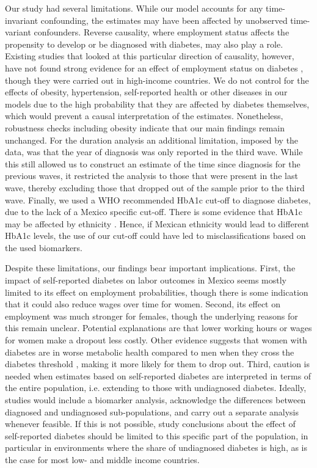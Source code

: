 \documentclass[12pt,english]{article}
\begin{document}
Our study had several limitations. While our model accounts for any time-invariant confounding, the estimates may have been affected by unobserved time-variant confounders. Reverse causality, where employment status affects the propensity to develop or be diagnosed with diabetes, may also play a role. Existing studies that looked at this particular direction of causality, however, have not found strong evidence for an effect of employment status on diabetes \parencite{Bergemann2011,Schaller2015}, though they were carried out in high-income countries. We do not control for the effects of obesity, hypertension, self-reported health or other diseases in our models due to the high probability that they are affected by diabetes themselves, which would prevent a causal interpretation of the estimates. Nonetheless, robustness checks including obesity indicate that our main findings remain unchanged.  For the duration analysis an additional limitation, imposed by the data, was that the year of diagnosis was only reported in the third wave. While this still allowed us to construct an estimate of the time since diagnosis for the previous waves, it restricted the analysis to those that were present in the last wave, thereby excluding those that dropped out of the sample prior to the third wave. Finally, we used a WHO recommended \ac{HbA1c} cut-off to diagnose diabetes, due to the lack of a Mexico specific cut-off. There is some evidence that \ac{HbA1c} may be affected by ethnicity \parencite{Sacks2011}. Hence, if Mexican ethnicity would lead to different \ac{HbA1c} levels, the use of our cut-off could have led to misclassifications based on the used biomarkers.  

Despite these limitations, our findings bear important implications. First, the impact of self-reported diabetes on labor outcomes in Mexico seems mostly limited to its effect on employment probabilities, though there is some indication that it could also reduce wages over time for women.  Second, its effect on employment was much stronger for females, though the underlying reasons for this remain unclear. Potential explanations are that lower working hours or wages for women make a dropout less costly. Other evidence suggests that women with diabetes are in worse metabolic health compared to men when they cross the diabetes threshold \parencite{Peters2015}, making it more likely for them to drop out. Third, caution is needed when estimates based on self-reported diabetes are interpreted in terms of the entire population, i.e. extending to those with undiagnosed diabetes. Ideally, studies would  include a biomarker analysis, acknowledge the differences between diagnosed and undiagnosed sub-populations, and carry out a separate analysis whenever feasible. If this is not possible, study conclusions about the effect of self-reported diabetes should be limited to this specific part of the population, in particular in environments where the share of undiagnosed diabetes is high, as is the case for most low- and middle income countries.
\end{document}
